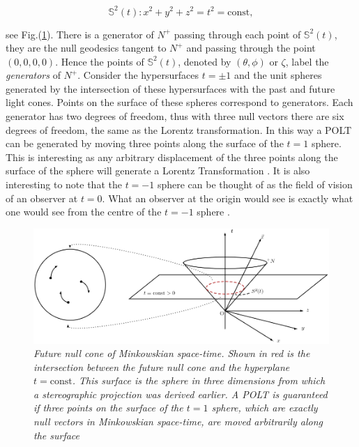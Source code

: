 \begin{equation}\label{Ext_Complex_2Sphere_Definition}
\mathbb{S}^2 (t) : x^2 + y^2 + z^2 = t^2 = \text{const}, 
\end{equation}

\noindent see Fig.(\ref{Ext_Complex_Intersection_Cone_Plane_Fig}). There is a generator of $N^+$ passing through each point of $\mathbb{S}^2 (t)$, they are the null geodesics tangent to $N^+$ and passing through the point $(0,0,0,0)$. Hence the points of $\mathbb{S}^2 (t)$, denoted by $(\theta,\phi)$ or $\zeta$, label the \textit{generators} of $N^{+}$. Consider the hypersurfaces $t= \pm 1$ and the unit spheres generated by the intersection of these hypersurfaces with the past and future light cones. Points on the surface of these spheres correspond to generators. Each generator has two degrees of freedom, thus with three null vectors there are six degrees of freedom, the same as the Lorentz transformation. In this way a POLT can be generated by moving three points along the surface of the $t = 1$ sphere. This is interesting as any arbitrary displacement of the three points along the surface of the sphere will generate a Lorentz Transformation \cite[p. 100]{Relativity_Synge}. It is also interesting to note that the $t = -1$ sphere can be thought of as the field of vision of an observer at $t = 0$. What an observer at the origin would see is exactly what one would see from the centre of the $t = -1$ sphere \cite[p. 9]{Spinors_I_Penrose}.   
 
\begin{figure}[h!]
\begin{center}
\caption{\textit{Future null cone of Minkowskian space-time. Shown in red is the intersection between the future null cone and the hyperplane $t=\text{const}$. This surface is the sphere in three dimensions from which a stereographic projection was derived earlier. A POLT is guaranteed if three points on the surface of the $t = 1$ sphere, which are exactly null vectors in Minkowskian space-time, are moved arbitrarily along the surface}}
\label{Ext_Complex_Intersection_Cone_Plane_Fig}
\includegraphics[scale=0.6]{figs/4_5_2.jpg}
\end{center}
\end{figure}


